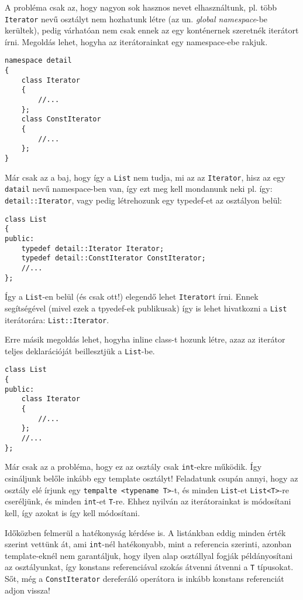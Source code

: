 \documentclass[a4paper,11.5pt]{article}
\begin{document}
	A probléma csak az, hogy nagyon sok hasznos nevet elhasználtunk, pl. több \texttt{Iterator} nevű osztályt nem hozhatunk létre (az un. \textit{global namespace}-be kerültek), pedig várhatóan nem csak ennek az egy konténernek szeretnék iterátort írni. Megoldás lehet, hogyha az iterátorainkat egy namespace-ebe rakjuk.
\begin{lstlisting}
namespace detail
{
	class Iterator
	{
		//...
	};
	class ConstIterator
	{
		//...
	};
}
\end{lstlisting}
	Már csak az a baj, hogy így a \texttt{List} nem tudja, mi az az \texttt{Iterator}, hisz az egy \texttt{datail} nevű namespace-ben van, így ezt meg kell mondanunk neki pl. így: \texttt{detail::Iterator}, vagy pedig létrehozunk egy typedef-et az osztályon belül:
\begin{lstlisting}
class List
{
public:
	typedef detail::Iterator Iterator;
	typedef detail::ConstIterator ConstIterator;
	//...
};
\end{lstlisting}
	Így a \texttt{List}-en belül (és csak ott!) elegendő lehet \texttt{Iterator}t írni. Ennek segítségével (mivel ezek a tpyedef-ek publikusak) így is lehet hivatkozni a \texttt{List} iterátorára: \texttt{List::Iterator}.
	
	Erre másik megoldás lehet, hogyha inline class-t hozunk létre, azaz az iterátor teljes deklarációját beillesztjük a \texttt{List}-be.
\begin{lstlisting}
class List
{
public:
	class Iterator
	{
		//...
	};
	//...
};
\end{lstlisting}
	Már csak az a probléma, hogy ez az osztály csak \texttt{int}-ekre működik. Így csináljunk belőle inkább egy template osztályt! Feladatunk csupán annyi, hogy az osztály elé írjunk egy \texttt{tempalte <typename T>}-t, és minden \texttt{List}-et \texttt{List<T>}-re cseréljünk, és minden \texttt{int}-et \texttt{T}-re. Ehhez nyilván az iterátorainkat is módosítani kell, így azokat is így kell módosítani.
	
	\medskip
	Időközben felmerül a hatékonyság kérdése is. A listánkban eddig minden érték szerint vettünk át, ami \texttt{int}-nél hatékonyabb, mint a referencia szerinti, azonban template-eknél nem garantáljuk, hogy ilyen alap osztállyal fogják példányosítani az osztályunkat, így konstans referenciával szokás átvenni átvenni a \texttt{T} típusokat. Sőt, még a \texttt{ConstIterator} dereferáló operátora is inkább konstans referenciát adjon vissza!
	
\end{document}
